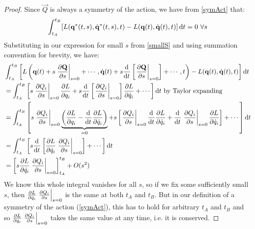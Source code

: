 \documentclass[../main.tex]{subfiles}
\begin{document}
\begin{proof}
  Since $\vec{Q}$ is always a symmetry of the action, we have from \cref{symAct} that:
  \[
    \int_{t_A}^{t_B} [L(\vec{q}^{*}(t, s), \dot{\vec{q}}^{*}(t, s), t) - L(\vec{q}(t), \dot{\vec{q}}(t), t)] \d{t} = 0\ \forall s
  \]
  Substituting in our expression for small $s$ from \cref{smallS} and using summation convention for brevity, we have:
  \begin{align*}
    &\int_{t_A}^{t_B} \left[L\left(\vec{q}(t) + s \at{\pderiv{\vec{Q}}{s}}{s = 0} + \cdots, \dot{\vec{q}}(t) + s \deriv{}{t}\left[\at{\pderiv{\vec{Q}}{s}}{s = 0}\right] + \cdots, t\right) -L(\vec{q}(t), \dot{\vec{q}}(t), t)\right] \d{t} \\
    &= \int_{t_A}^{t_B} \left[s \at{\pderiv{Q_i}{s}}{s=0} \pderiv{L}{q_i} + s \deriv{}{t}\left[\at{\pderiv{Q_i}{s}}{s = 0}\right] \pderiv{L}{\dot{q}_i} + \cdots\right] \d{t} \text{ by Taylor expanding} \\
    &=\int_{t_A}^{t_B} \left[s \at{\pderiv{Q_i}{s}}{s = 0} \underbrace{\left(\pderiv{L}{q_i} - \deriv{}{t}\pderiv{L}{\dot{q}_i}\right)}_{=0} + s \left[\at{\pderiv{Q_i}{s}}{s=0}\deriv{}{t}\pderiv{L}{\dot{q}_i} + \deriv{}{t}\at{\pderiv{Q_i}{s}}{s=0}\pderiv{L}{\dot{q}_i}\right] + \cdots\right] \d{t} \\
    &=\int_{t_A}^{t_B} \left[s \deriv{}{t}\left[\pderiv{L}{\dot{q}_i} \at{\pderiv{Q_i}{s}}{s = 0}\right] + \cdots\right] \d{t} \\
    &= \eval{s \pderiv{L}{\dot{q}_i} \at{\pderiv{Q_i}{s}}{s = 0}}{t_A}{t_B} + O(s^2)
  \end{align*}
  We know this whole integral vanishes for all $s$, so if we fix some sufficiently small $s$, then $\pderiv{L}{\dot{q}_i} \at{\pderiv{Q_i}{s}}{s = 0}$ is the same at both $t_A$ and $t_{B}$.
  But in our definition of a symmetry of the action (\cref{symAct}), this has to hold for arbitrary $t_A$ and $t_B$ and so $\pderiv{L}{\dot{q}_i} \at{\pderiv{Q_i}{s}}{s = 0}$ takes the same value at any time, i.e. it is conserved.
\end{proof}
\end{document}

